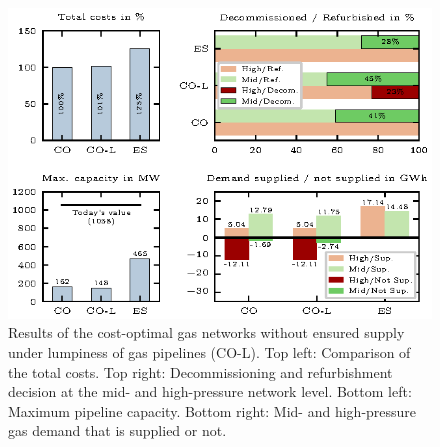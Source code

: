 \begin{figure}[h]
	\centering
	\includegraphics[width=1\linewidth]{figures/synthese/comparison.eps}
	\caption{Results of the cost-optimal gas networks without ensured supply under lumpiness of gas pipelines (CO-L). Top left: Comparison of the total costs. Top right: Decommissioning and refurbishment decision at the mid- and high-pressure network level. Bottom left: Maximum pipeline capacity. Bottom right: Mid- and high-pressure gas demand that is supplied or not.}
	\label{fig:result5}
\end{figure}
